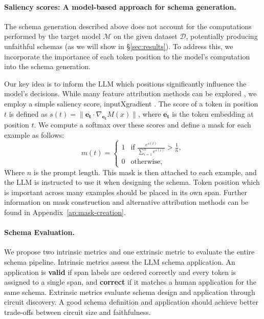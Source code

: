 \paragraph{Saliency scores: A model-based approach for schema generation.}

The schema generation described above does not account for the computations performed by the target model $\mathcal{M}$ on the given dataset $\mathcal{D}$, potentially producing unfaithful schemas (as we will show in \S\ref{sec:results}).
To address this, we incorporate the importance of each token position to the model's computation into the schema generation.

Our key idea is to inform the LLM which positions significantly influence the model's decisions.
While many feature attribution methods can be explored \cite{danilevsky-etal-2020-survey,wiegreffe2021teach,wallace-etal-2020-interpreting}, we employ a simple saliency score, inputXgradient \cite{shrikumar2017learning}.
The score of a token in position $t$ is defined as 
$ s(t) = \| \mathbf{e_t} \cdot \nabla_{\mathbf{e_t}} M(x) \| $, where $ \mathbf{e_t} $ is the token embedding at position $ t $.
We compute a softmax over these scores and define a mask for each example as follows:
\begin{equation}
m(t) =
\begin{cases}
1 & \text{if } \frac{e^{s(t)}}{\sum_{i=1}^{n} e^{s(i)}} > \frac{1}{n}, \\
0 & \text{otherwise},
\end{cases}
\end{equation}
Where $n$ is the prompt length.
This mask is then attached to each example, and the LLM is instructed to use it when designing the schema.
Token position which is important across many examples should be placed in its own span. Further information on mask construction and alternative attribution methods can be found in Appendix~\ref{ap:mask-creation}.


\paragraph{Schema Evaluation.}\label{sec:schema-eval}
We propose two intrinsic metrics and one extrinsic metric to evaluate the entire schema pipeline.
Intrinsic metrics assess the LLM schema application. An application is \textbf{valid} if span labels are ordered correctly and every token is assigned to a single span, and \textbf{correct} if it matches a human application for the same schema.
Extrinsic metrics evaluate schema design and application through circuit discovery.
A good schema definition and application should achieve better trade-offs between circuit size and faithfulness.

